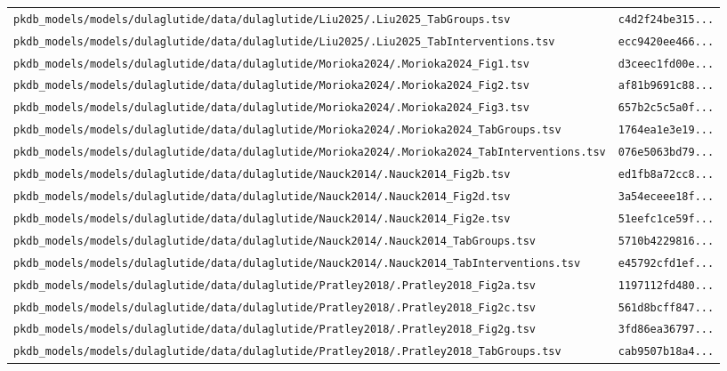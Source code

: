 \documentclass{article}
\begin{document}
\begin{longtable}{ll}
\texttt{pkdb\_models/models/dulaglutide/data/dulaglutide/Liu2025/.Liu2025\_TabGroups.tsv} & \texttt{c4d2f24be315...} \\
\texttt{pkdb\_models/models/dulaglutide/data/dulaglutide/Liu2025/.Liu2025\_TabInterventions.tsv} & \texttt{ecc9420ee466...} \\
\texttt{pkdb\_models/models/dulaglutide/data/dulaglutide/Morioka2024/.Morioka2024\_Fig1.tsv} & \texttt{d3ceec1fd00e...} \\
\texttt{pkdb\_models/models/dulaglutide/data/dulaglutide/Morioka2024/.Morioka2024\_Fig2.tsv} & \texttt{af81b9691c88...} \\
\texttt{pkdb\_models/models/dulaglutide/data/dulaglutide/Morioka2024/.Morioka2024\_Fig3.tsv} & \texttt{657b2c5c5a0f...} \\
\texttt{pkdb\_models/models/dulaglutide/data/dulaglutide/Morioka2024/.Morioka2024\_TabGroups.tsv} & \texttt{1764ea1e3e19...} \\
\texttt{pkdb\_models/models/dulaglutide/data/dulaglutide/Morioka2024/.Morioka2024\_TabInterventions.tsv} & \texttt{076e5063bd79...} \\
\texttt{pkdb\_models/models/dulaglutide/data/dulaglutide/Nauck2014/.Nauck2014\_Fig2b.tsv} & \texttt{ed1fb8a72cc8...} \\
\texttt{pkdb\_models/models/dulaglutide/data/dulaglutide/Nauck2014/.Nauck2014\_Fig2d.tsv} & \texttt{3a54eceee18f...} \\
\texttt{pkdb\_models/models/dulaglutide/data/dulaglutide/Nauck2014/.Nauck2014\_Fig2e.tsv} & \texttt{51eefc1ce59f...} \\
\texttt{pkdb\_models/models/dulaglutide/data/dulaglutide/Nauck2014/.Nauck2014\_TabGroups.tsv} & \texttt{5710b4229816...} \\
\texttt{pkdb\_models/models/dulaglutide/data/dulaglutide/Nauck2014/.Nauck2014\_TabInterventions.tsv} & \texttt{e45792cfd1ef...} \\
\texttt{pkdb\_models/models/dulaglutide/data/dulaglutide/Pratley2018/.Pratley2018\_Fig2a.tsv} & \texttt{1197112fd480...} \\
\texttt{pkdb\_models/models/dulaglutide/data/dulaglutide/Pratley2018/.Pratley2018\_Fig2c.tsv} & \texttt{561d8bcff847...} \\
\texttt{pkdb\_models/models/dulaglutide/data/dulaglutide/Pratley2018/.Pratley2018\_Fig2g.tsv} & \texttt{3fd86ea36797...} \\
\texttt{pkdb\_models/models/dulaglutide/data/dulaglutide/Pratley2018/.Pratley2018\_TabGroups.tsv} & \texttt{cab9507b18a4...} \\

\end{longtable}
\end{document}
